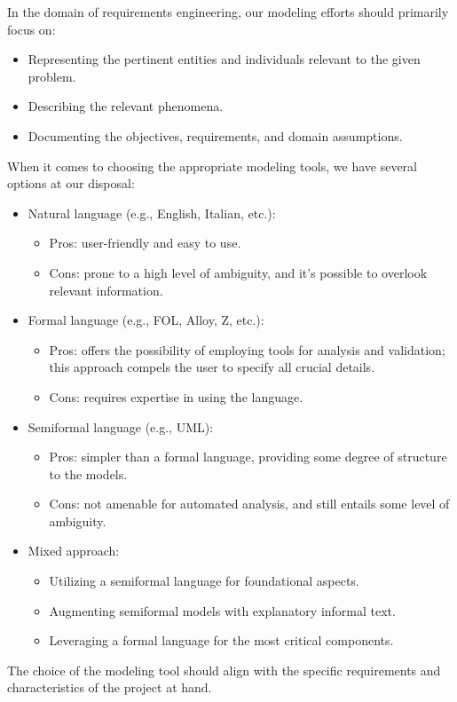 \documentclass[12pt, a4paper]{report}
\begin{document}
    In the domain of requirements engineering, our modeling efforts should primarily focus on:
    \begin{itemize}
        \item Representing the pertinent entities and individuals relevant to the given problem.
        \item Describing the relevant phenomena.
        \item Documenting the objectives, requirements, and domain assumptions.
    \end{itemize}
    When it comes to choosing the appropriate modeling tools, we have several options at our disposal:
    \begin{itemize}
        \item Natural language (e.g., English, Italian, etc.):
            \begin{itemize}
                \item Pros: user-friendly and easy to use.
                \item Cons: prone to a high level of ambiguity, and it's possible to overlook relevant information.
            \end{itemize}
        \item Formal language (e.g., FOL, Alloy, Z, etc.):
            \begin{itemize}
                \item Pros: offers the possibility of employing tools for analysis and validation; this approach compels the user to specify all crucial details.
                \item Cons: requires expertise in using the language.
            \end{itemize}
        \item Semiformal language (e.g., UML):
            \begin{itemize}
                \item Pros: simpler than a formal language, providing some degree of structure to the models.
                \item Cons: not amenable for automated analysis, and still entails some level of ambiguity.
            \end{itemize}
        \item Mixed approach:             
            \begin{itemize}
                \item Utilizing a semiformal language for foundational aspects.
                \item Augmenting semiformal models with explanatory informal text.
                \item Leveraging a formal language for the most critical components.
            \end{itemize}
    \end{itemize}
    The choice of the modeling tool should align with the specific requirements and characteristics of the project at hand.
\end{document}
